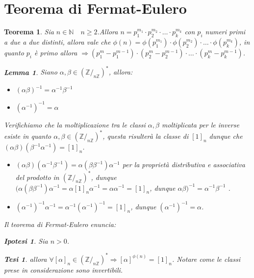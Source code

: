 \documentclass{article}
\makeatletter
\renewenvironment{proof}[1][\proofname]{\par
    \pushQED{\qed}%
    \normalfont \topsep6\p@\@plus6\p@\relax
    \trivlist
    \item\relax
    {\itshape
    #1\@addpunct{.}}\hspace\labelsep\ignorespaces
    }{%
    \popQED\endtrivlist\@endpefalse
}
\newtheorem{theorem}{Teorema}[part]
\newtheorem{ipothesis}[lemma]{Ipotesi}
\newtheorem{thesis}[lemma]{Tesi}
\newtheorem*{lemma*}{Lemma}
\newcommand{\Z}{\mathbb{Z}}
\newcommand{\N}{\mathbb{N}}
\makeatother
\begin{document}
\section{Teorema di Fermat-Eulero}
\begin{theorem}
    Sia \(n\in\N\quad n\geq 2\).Allora \(n=p_1^{m_1}\cdot p_2^{m_2}\cdot\ldots\cdot p_k^{m_k}\) con \(p_i\) numeri primi a due a due distinti, allora vale che \(\phi(n)=\phi(p_1^{m_1})\cdot\phi(p_2^{m_2})\cdot\ldots\cdot\phi(p_k^{m_k})\), in quanto \(p_i\) è primo allora \(\Rightarrow(p_1^{m}-p_1^{m-1})\cdot(p_2^{m}-p_2^{m-1})\cdot\ldots\cdot(p_k^{m}-p_k^{m-1})\). 
    \begin{lemma*}
        Siano \(\alpha,\beta\in(\Z/_{n\Z})^*\), allora:
        \begin{itemize}
            \item \((\alpha\beta)^{-1}=\alpha^{-1}\beta^{-1}\)
            \item \((\alpha^{-1})^{-1}=\alpha\)
        \end{itemize}
        \begin{proof}
            Verifichiamo che la moltiplicazione tra le classi \(\alpha,\beta\) moltiplicata per le inverse esiste in quanto \(\alpha,\beta\in(\Z/_{n\Z})^*\), questa risulterà la classe di \([1]_n\) dunque che \((\alpha\beta)(\beta^{-1}\alpha^{-1})=[1]_n\).
            \begin{itemize}
                \item \((\alpha\beta)(\alpha^{-1}\beta^{-1})=\alpha(\beta\beta^{-1})\alpha^{-1}\) per la proprietà distributiva e associativa del prodotto in \((\Z/_{n\Z})^*\), dunque \((\alpha(\beta\beta^{-1})\alpha^{-1}=\alpha[1]_n\alpha^{-1}=\alpha\alpha^{-1}=[1]_n\), dunque \(\alpha\beta)^{-1}=\alpha^{-1}\beta^{-1}\) \checkmark.
                \item \((\alpha^{-1})^{-1}\alpha^{-1}=\alpha^{-1}(\alpha^{-1})^{-1}=[1]_n\), dunque \((\alpha^{-1})^{-1}=\alpha\).
            \end{itemize}
        \end{proof}
    \end{lemma*}
    Il teorema di Fermat-Eulero enuncia:
    \begin{ipothesis}
        Sia \(n>0\).
    \end{ipothesis}
    \begin{thesis}
        allora \(\forall[\alpha]_n\in(\Z/_{n\Z})^*\Rightarrow[\alpha]^{\phi(n)}=[1]_n\).
        Notare come le classi prese in considerazione sono invertibili.
    \end{thesis}

\end{theorem}
\end{document}
